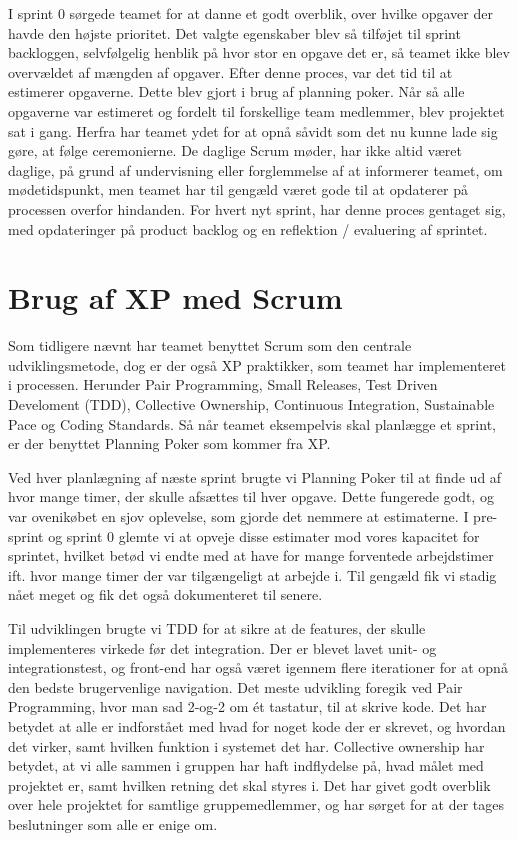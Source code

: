 I sprint 0 sørgede teamet for at danne et godt overblik, over hvilke opgaver der havde den højste prioritet. Det valgte egenskaber blev så tilføjet til sprint backloggen, selvfølgelig henblik på hvor stor en opgave det er, så teamet ikke blev overvældet af mængden af opgaver. Efter denne proces, var det tid til at estimerer opgaverne. Dette blev gjort i brug af planning poker. Når så alle opgaverne var estimeret og fordelt til forskellige team medlemmer, blev projektet sat i gang. Herfra har teamet ydet for at opnå såvidt som det nu kunne lade sig gøre, at følge ceremonierne. De daglige Scrum møder, har ikke altid været daglige, på grund af undervisning eller forglemmelse af at informerer teamet, om mødetidspunkt, men teamet har til gengæld været gode til at opdaterer på processen overfor hindanden. For hvert nyt sprint, har denne proces gentaget sig, med opdateringer på product backlog og en reflektion / evaluering af sprintet. 



\section{Brug af XP med Scrum}

Som tidligere nævnt har teamet benyttet Scrum som den centrale udviklingsmetode, dog er der også XP praktikker, som teamet har implementeret i processen. Herunder Pair Programming, Small Releases, Test Driven Develoment (TDD), Collective Ownership, Continuous Integration, Sustainable Pace og Coding Standards. Så når teamet eksempelvis skal planlægge et sprint, er der benyttet Planning Poker som kommer fra XP. 

Ved hver planlægning af næste sprint brugte vi Planning Poker til at finde ud af hvor mange timer, der skulle afsættes til hver opgave. Dette fungerede godt, og var ovenikøbet en sjov oplevelse, som gjorde det nemmere at estimaterne. I pre-sprint og sprint 0 glemte vi at opveje disse estimater mod vores kapacitet for sprintet, hvilket betød vi endte med at have for mange forventede arbejdstimer ift. hvor mange timer der var tilgængeligt at arbejde i. Til gengæld fik vi stadig nået meget og fik det også dokumenteret til senere. 

Til udviklingen brugte vi TDD for at sikre at de features, der skulle implementeres virkede før det integration. Der er blevet lavet unit- og integrationstest, og front-end har også været igennem flere iterationer for at opnå den bedste brugervenlige navigation. 
Det meste udvikling foregik ved Pair Programming, hvor man sad 2-og-2 om ét tastatur, til at skrive kode. Det har betydet at alle er indforstået med hvad for noget kode der er skrevet, og hvordan det virker, samt hvilken funktion i systemet det har. 
Collective ownership har betydet, at vi alle sammen i gruppen har haft indflydelse på, hvad målet med projektet er, samt hvilken retning det skal styres i. Det har givet godt overblik over hele projektet for samtlige gruppemedlemmer, og har sørget for at der tages beslutninger som alle er enige om.

